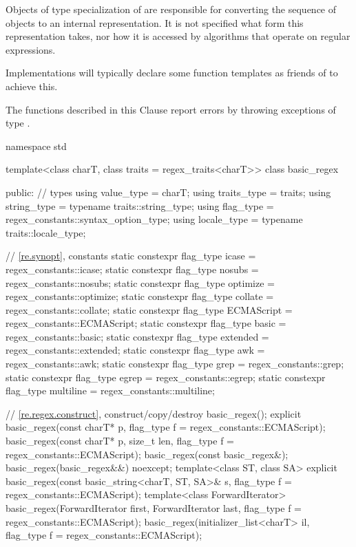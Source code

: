\pnum
Objects of type specialization of  are responsible for
converting the sequence of  objects to an internal
representation. It is not specified what form this representation
takes, nor how it is accessed by algorithms that operate on regular
expressions.
\begin{note}
Implementations will typically declare
some function templates as friends of  to achieve
this.
\end{note}

\pnum
{}%
The functions described in this Clause report errors by throwing
exceptions of type .

%
\begin{codeblock}
namespace std {
  template<class charT, class traits = regex_traits<charT>>
    class basic_regex {
    public:
      // types
      using value_type  =          charT;
      using traits_type =          traits;
      using string_type = typename traits::string_type;
      using flag_type   =          regex_constants::syntax_option_type;
      using locale_type = typename traits::locale_type;

      // \ref{re.synopt}, constants
      static constexpr flag_type icase = regex_constants::icase;
      static constexpr flag_type nosubs = regex_constants::nosubs;
      static constexpr flag_type optimize = regex_constants::optimize;
      static constexpr flag_type collate = regex_constants::collate;
      static constexpr flag_type ECMAScript = regex_constants::ECMAScript;
      static constexpr flag_type basic = regex_constants::basic;
      static constexpr flag_type extended = regex_constants::extended;
      static constexpr flag_type awk = regex_constants::awk;
      static constexpr flag_type grep = regex_constants::grep;
      static constexpr flag_type egrep = regex_constants::egrep;
      static constexpr flag_type multiline = regex_constants::multiline;

      // \ref{re.regex.construct}, construct/copy/destroy
      basic_regex();
      explicit basic_regex(const charT* p, flag_type f = regex_constants::ECMAScript);
      basic_regex(const charT* p, size_t len, flag_type f = regex_constants::ECMAScript);
      basic_regex(const basic_regex&);
      basic_regex(basic_regex&&) noexcept;
      template<class ST, class SA>
        explicit basic_regex(const basic_string<charT, ST, SA>& s,
                             flag_type f = regex_constants::ECMAScript);
      template<class ForwardIterator>
        basic_regex(ForwardIterator first, ForwardIterator last,
                    flag_type f = regex_constants::ECMAScript);
      basic_regex(initializer_list<charT> il, flag_type f = regex_constants::ECMAScript);

}}
\end{codeblock}
